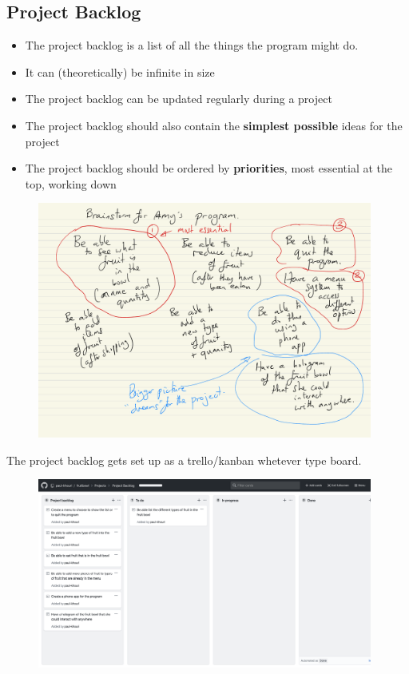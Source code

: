 \documentclass[a4paper,12pt]{article}
\begin{document}
	\subsection{Project Backlog}
	\begin{itemize}
		\item The project backlog is a list of all the things the program might do.
		\item It can (theoretically) be infinite in size
		\item The project backlog can be updated regularly during a project
		\item The project backlog should also contain the \textbf{simplest possible} ideas for the project
		\item The project backlog should be ordered by \textbf{priorities}, most essential at the top, working down
	\end{itemize}
\begin{figure}[!ht]
	\centering
	\includegraphics[width=11cm]{brainstorm_plan.pdf}
\end{figure}

The project backlog gets set up as a trello/kanban whetever type board.
\begin{figure}[!ht]
	\centering
	\includegraphics[width=11cm]{images/Project_backlog.png}
\end{figure}
	
\end{document}
